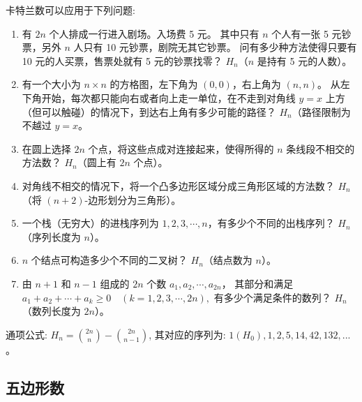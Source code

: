 \documentclass[a4paper,12pt]{article}
\begin{document}
\noindent 卡特兰数可以应用于下列问题: \\

\begin{enumerate}
    \item 有 \( 2n \) 个人排成一行进入剧场。入场费 5 元。
    其中只有 \( n \) 个人有一张 5 元钞票，另外 \( n \) 人只有 10 元钞票，剧院无其它钞票。
    问有多少种方法使得只要有 10 元的人买票，售票处就有 5 元的钞票找零？
    \( H_n \)（\( n \) 是持有 5 元的人数）。\\

    \item 有一个大小为 \( n \times n \) 的方格图，左下角为 \((0,0)\)，右上角为 \((n,n)\)。
    从左下角开始，每次都只能向右或者向上走一单位，在不走到对角线 \( y = x \) 上方（但可以触碰）的情况下，到达右上角有多少可能的路径？
    \( H_n \)（路径限制为不越过 \( y = x \)。\\

    \item 在圆上选择 \( 2n \) 个点，将这些点成对连接起来，使得所得的 \( n \) 条线段不相交的方法数？
    \( H_n \)（圆上有 \( 2n \) 个点）。\\
    
    \item 对角线不相交的情况下，将一个凸多边形区域分成三角形区域的方法数？
    \( H_n \)（将 \( (n+2) \)-边形划分为三角形）。\\

    \item 一个栈（无穷大）的进栈序列为 \( 1,2,3,\cdots,n \)，有多少个不同的出栈序列？
    \( H_n \)（序列长度为 \( n \)）。\\

    \item \( n \) 个结点可构造多少个不同的二叉树？
    \( H_n \)（结点数为 \( n \)）。\\

    \item 由 \( n + 1 \) 和 \( n - 1 \) 组成的 \( 2n \) 个数 \( a_1,a_2,\cdots,a_{2n} \)，
    其部分和满足 \(a_1 + a_2 + \cdots + a_k \geq 0 \quad (k=1,2,3,\cdots,2n),\) 
    有多少个满足条件的数列？
    \( H_n \)（数列长度为 \( 2n \)）。\\
\end{enumerate}

\noindent 通项公式: $H_n = \binom{2n}{n} - \binom{2n}{n-1}$,
其对应的序列为: $1(H_0),1,2,5,14,42,132,...$。\\

\subsection{五边形数}
\end{document}
